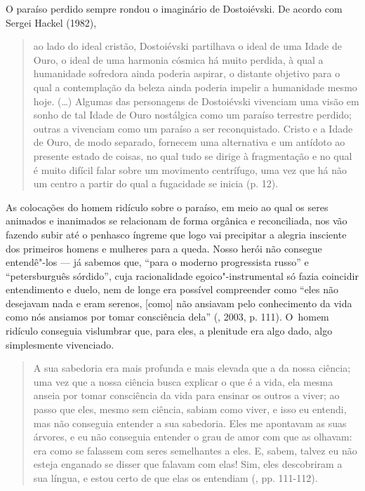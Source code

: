 O paraíso perdido sempre rondou o imaginário de Dostoiévski. De acordo
com Sergei Hackel (1982),

\begin{quote}
ao lado do ideal cristão, Dostoiévski partilhava o ideal de uma Idade de
Ouro, o ideal de uma harmonia cósmica há muito perdida, à qual a
humanidade sofredora ainda poderia aspirar, o distante objetivo para o
qual a contemplação da beleza ainda poderia impelir a humanidade mesmo
hoje. (\ldots) Algumas das personagens de Dostoiévski vivenciam uma visão
em sonho de tal Idade de Ouro nostálgica como um paraíso terrestre
perdido; outras a vivenciam como um paraíso a ser reconquistado. Cristo
e a Idade de Ouro, de modo separado, fornecem uma alternativa e um
antídoto ao presente estado de coisas, no qual tudo se dirige à
fragmentação e no qual é muito difícil falar sobre um movimento
centrífugo, uma vez que há não um centro a partir do qual a fugacidade
se inicia (p. 12).
\end{quote}

As colocações do homem ridículo sobre o paraíso, em meio ao qual os
seres animados e inanimados se relacionam de forma orgânica e
reconciliada, nos vão fazendo subir até o penhasco íngreme que logo vai
precipitar a alegria insciente dos primeiros homens e mulheres para a
queda. Nosso herói não consegue entendê"-los --- já sabemos que, ``para o
moderno progressista russo'' e ``petersburguês sórdido'', cuja
racionalidade egoico"-instrumental só fazia coincidir entendimento e
duelo, nem de longe era possível compreender como ``eles não desejavam
nada e eram serenos, {[}como{]} não ansiavam pelo conhecimento da vida
como nós ansiamos por tomar consciência dela'' (, 2003, p.
111). O~homem ridículo conseguia vislumbrar que, para eles, a plenitude
era algo dado, algo simplesmente vivenciado.

\begin{quote}
A sua sabedoria era mais profunda e mais elevada que a da nossa ciência;
uma vez que a nossa ciência busca explicar o que é a vida, ela mesma
anseia por tomar consciência da vida para ensinar os outros a viver; ao
passo que eles, mesmo sem ciência, sabiam como viver, e isso eu entendi,
mas não conseguia entender a sua sabedoria. Eles me apontavam as suas
árvores, e eu não conseguia entender o grau de amor com que as olhavam:
era como se falassem com seres semelhantes a eles. E, sabem, talvez eu
não esteja enganado se disser que falavam com elas! Sim, eles
descobriram a sua língua, e estou certo de que elas os entendiam (,
pp. 111-112).
\end{quote}

